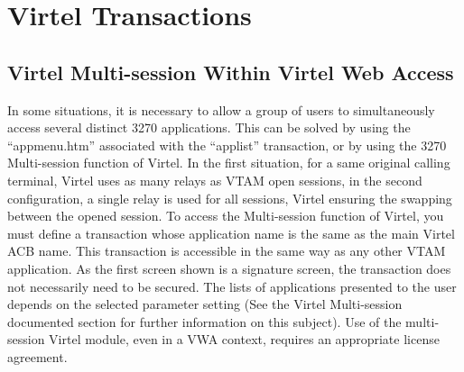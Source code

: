 \documentclass[letterpaper,10pt,english]{sphinxmanual}
\begin{document}
\ignorespaces 

\chapter{Virtel Transactions}
\label{\detokenize{Customization:virtel-transactions}}\label{\detokenize{Customization:index-62}}
\ignorespaces 

\section{Virtel Multi-session Within Virtel Web Access}
\label{\detokenize{Customization:virtel-multi-session-within-virtel-web-access}}\label{\detokenize{Customization:index-63}}
In some situations, it is necessary to allow a group of users to simultaneously access several distinct 3270 applications. This can be solved by using the “appmenu.htm” associated with the “applist” transaction, or by using the 3270 Multi-session function of Virtel. In the first situation, for a same original calling terminal, Virtel uses as many relays as VTAM open sessions, in the second configuration, a single relay is used for all sessions, Virtel ensuring the swapping between the opened session. To access the Multi-session function of Virtel, you must define a transaction whose application name is the same as the main Virtel ACB name. This transaction is accessible in the same way as any other VTAM application. As the first screen shown is a signature screen, the transaction does not necessarily need to be secured. The lists of applications presented to the user depends on the selected parameter setting (See the Virtel Multi-session documented section for further information on this subject). Use of the multi-session Virtel module, even in a VWA context, requires an appropriate license agreement.


\end{document}

